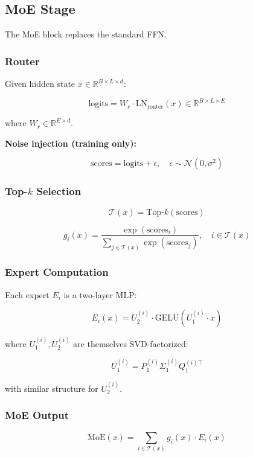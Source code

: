 \subsection{MoE Stage}

The MoE block replaces the standard FFN.

\subsubsection{Router}

Given hidden state $x \in \mathbb{R}^{B \times L \times d}$:

\[
\text{logits} = W_r \cdot \text{LN}_\text{router}(x) \in \mathbb{R}^{B \times L \times E}
\tag{4.4}
\]

where $W_r \in \mathbb{R}^{E \times d}$.

\textbf{Noise injection (training only):}

\[
\text{scores} = \text{logits} + \epsilon, \quad \epsilon \sim \mathcal{N}(0, \sigma^2)
\tag{4.5}
\]

\subsubsection{Top-$k$ Selection}

\[
\mathcal{T}(x) = \text{Top-}k(\text{scores})
\tag{4.6}
\]

\[
g_i(x) = \frac{\exp(\text{scores}_i)}{\sum_{j \in \mathcal{T}(x)} \exp(\text{scores}_j)}, \quad i \in \mathcal{T}(x)
\tag{4.7}
\]

\subsubsection{Expert Computation}

Each expert $E_i$ is a two-layer MLP:

\[
E_i(x) = U_2^{(i)} \cdot \text{GELU}(U_1^{(i)} \cdot x)
\tag{4.8}
\]

where $U_1^{(i)}, U_2^{(i)}$ are themselves SVD-factorized:

\[
U_1^{(i)} = P_1^{(i)} \Sigma_1^{(i)} Q_1^{(i)\top}
\tag{4.9}
\]

with similar structure for $U_2^{(i)}$.

\subsubsection{MoE Output}

\[
\text{MoE}(x) = \sum_{i \in \mathcal{T}(x)} g_i(x) \cdot E_i(x)
\tag{4.10}
\]


